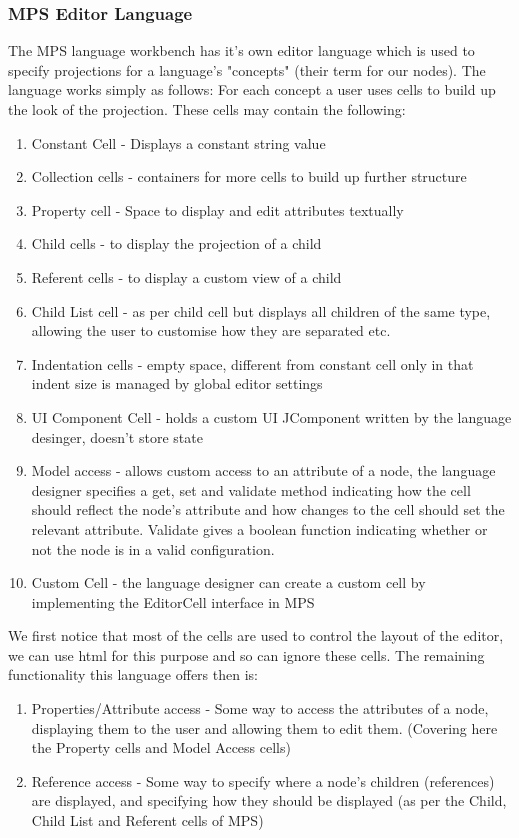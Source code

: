 \documentclass{report}
\begin{document}
\subsubsection{MPS Editor Language}
The MPS language workbench has it's own editor language\cite{mpsEditorLanguage} which is used to specify projections for a language's "concepts" (their term for our nodes). The language works simply as follows: For each concept a user uses cells to build up the look of the projection. These cells may contain the following:
\begin{enumerate}
\item Constant Cell - Displays a constant string value
\item Collection cells - containers for more cells to build up further structure
\item Property cell - Space to display and edit attributes textually
\item Child cells - to display the projection of a child
\item Referent cells - to display a custom view of a child
\item Child List cell - as per child cell but displays all children of the same type, allowing the user to customise how they are separated etc.
\item Indentation cells - empty space, different from constant cell only in that indent size is managed by global editor settings
\item UI Component Cell - holds a custom UI JComponent written by the language desinger, doesn't store state
\item Model access - allows custom access to an attribute of a node, the language designer specifies a get, set and validate method indicating how the cell should reflect the node's attribute and how changes to the cell should set the relevant attribute. Validate gives a boolean function indicating whether or not the node is in a valid configuration.
\item Custom Cell - the language designer can create a custom cell by implementing the EditorCell interface in MPS
\end{enumerate}
%
We first notice that most of the cells are used to control the layout of the editor, we can use html for this purpose and so can ignore these cells. The remaining functionality this language offers then is:
\begin{enumerate}
\item Properties/Attribute access - Some way to access the attributes of a node, displaying them to the user and allowing them to edit them.  (Covering here the Property cells and Model Access cells)
\item Reference access - Some way to specify where a node's children (references) are displayed, and specifying how they should be displayed (as per the Child, Child List and Referent cells of MPS)
\end{enumerate}
\end{document}
